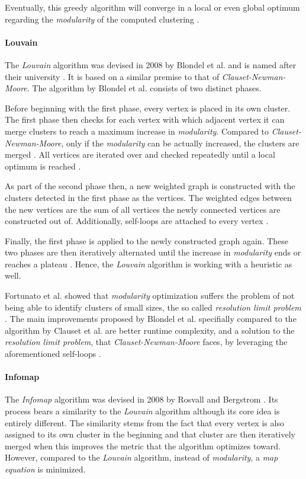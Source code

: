 \documentclass[12pt,a4paper]{report}
\begin{document}
Eventually, this greedy algorithm will converge in a local or even global
optimum regarding the \textit{modularity} of the computed clustering
\cite{clauset2004modularity}.

\paragraph{Louvain \cite{blondel2008modularity}}
The \textit{Louvain} algorithm was devised in 2008 by Blondel et al. and is
named after their university \cite{blondel2008modularity}.
It is based on a similar premise to that of \textit{Clauset-Newman-Moore}.
The algorithm by Blondel et al. consists of two distinct phases.

Before beginning with the first phase, every vertex is placed in its own cluster.
The first phase then checks for each vertex with which adjacent vertex it can
merge clusters to reach a maximum increase in \textit{modularity}.
Compared to \textit{Clauset-Newman-Moore}, only if the \textit{modularity}
can be actually increased, the clusters are merged \cite{blondel2008modularity}.
All vertices are iterated over and checked repeatedly until a local optimum
is reached \cite{blondel2008modularity}.

As part of the second phase then, a new weighted graph is constructed with
the clusters detected in the first phase as the vertices.
The weighted edges between the new vertices are the sum of all vertices
the newly connected vertices are constructed out of.
Additionally, self-loops are attached to every vertex \cite{blondel2008modularity}.

Finally, the first phase is applied to the newly constructed graph again.
These two phases are then iteratively alternated until the increase in
\textit{modularity} ends or reaches a plateau \cite{blondel2008modularity}.
Hence, the \textit{Louvain} algorithm is working with a heuristic as well.

Fortunato et al. showed that \textit{modularity} optimization suffers
the problem of not being able to identify clusters of small sizes, the so called
\textit{resolution limit problem} \cite{fortunato2007resolution}.
The main improvements proposed by Blondel et al. specifially compared
to the algorithm by Clauset et al. are better runtime complexity, and a solution
to the \textit{resolution limit problem}, that \textit{Clauset-Newman-Moore}
faces, by leveraging the aforementioned self-loops \cite{blondel2008modularity}.

\paragraph{Infomap \cite{rosvall2008infomap}}
The \textit{Infomap} algorithm was devised in 2008 by Rosvall and Bergstrom
\cite{rosvall2008infomap}.
Its process bears a similarity to the \textit{Louvain} algorithm although
its core idea is entirely different. The similarity stems from the fact
that every vertex is also assigned to its own cluster in the beginning and
that cluster are then iteratively merged when this improves the metric that
the algorithm optimizes toward. However, compared to the \textit{Louvain}
algorithm, instead of \textit{modularity}, a \textit{map equation} is minimized.
\end{document}
